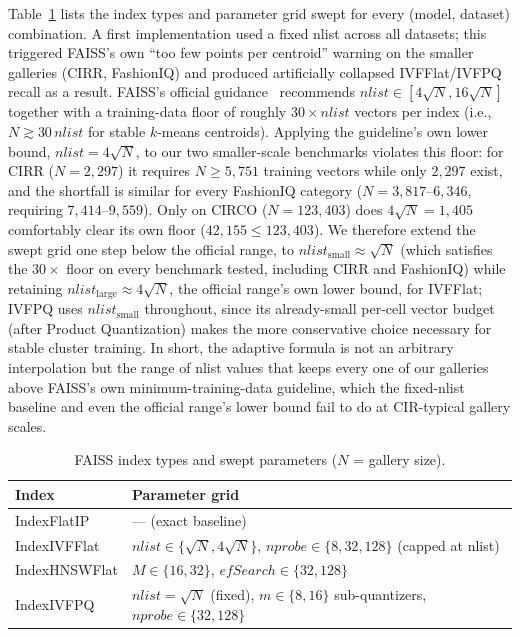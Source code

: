 \documentclass[conference]{IEEEtran}
\begin{document}
Table~\ref{tab:sweep} lists the index types and parameter grid swept for every (model, dataset) combination. A first implementation used a fixed nlist across all datasets; this triggered FAISS's own ``too few points per centroid'' warning on the smaller galleries (CIRR, FashionIQ) and produced artificially collapsed IVFFlat/IVFPQ recall as a result. FAISS's official guidance~\cite{johnson2019faiss,faisswiki2024guidelines} recommends $nlist \in [4\sqrt{N}, 16\sqrt{N}]$ together with a training-data floor of roughly $30 \times nlist$ vectors per index (i.e., $N \gtrsim 30\,nlist$ for stable $k$-means centroids). Applying the guideline's own lower bound, $nlist = 4\sqrt{N}$, to our two smaller-scale benchmarks violates this floor: for CIRR ($N{=}2{,}297$) it requires $N \geq 5{,}751$ training vectors while only $2{,}297$ exist, and the shortfall is similar for every FashionIQ category ($N{=}3{,}817$--$6{,}346$, requiring $7{,}414$--$9{,}559$). Only on CIRCO ($N{=}123{,}403$) does $4\sqrt{N}=1{,}405$ comfortably clear its own floor ($42{,}155 \leq 123{,}403$). We therefore extend the swept grid one step below the official range, to $nlist_{\text{small}} \approx \sqrt{N}$ (which satisfies the $30\times$ floor on every benchmark tested, including CIRR and FashionIQ) while retaining $nlist_{\text{large}} \approx 4\sqrt{N}$, the official range's own lower bound, for IVFFlat; IVFPQ uses $nlist_{\text{small}}$ throughout, since its already-small per-cell vector budget (after Product Quantization) makes the more conservative choice necessary for stable cluster training. In short, the adaptive formula is not an arbitrary interpolation but the range of nlist values that keeps every one of our galleries above FAISS's own minimum-training-data guideline, which the fixed-nlist baseline and even the official range's lower bound fail to do at CIR-typical gallery scales.

\begin{table}[!b] %
\caption{FAISS index types and swept parameters ($N$ = gallery size).}
\label{tab:sweep}
\renewcommand{\arraystretch}{0.8}
\begin{tabular}{>{\raggedright\arraybackslash}p{1.7cm} >{\raggedright\arraybackslash}p{5.6cm}}
\toprule
\textbf{Index} & \textbf{Parameter grid} \\
\midrule
IndexFlatIP & --- (exact baseline) \\
IndexIVFFlat & $nlist \in \{\sqrt{N}, 4\sqrt{N}\}$, $nprobe \in \{8, 32, 128\}$ (capped at nlist) \\
IndexHNSWFlat & $M \in \{16, 32\}$, $efSearch \in \{32, 128\}$ \\
IndexIVFPQ & $nlist = \sqrt{N}$ (fixed), $m \in \{8, 16\}$ sub-quantizers, $nprobe \in \{32, 128\}$ \\
\bottomrule
\end{tabular}
\end{table}
\end{document}

